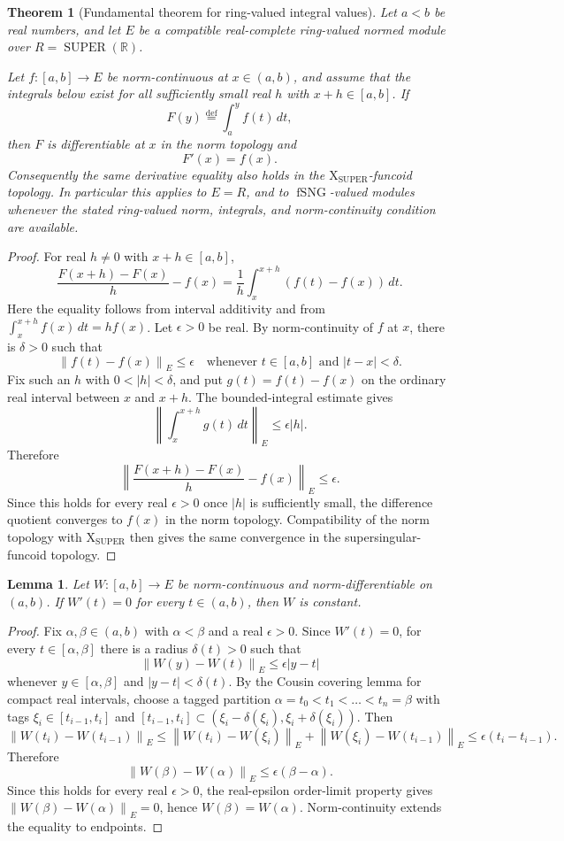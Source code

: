 \documentclass{amsart}
\newtheorem{thm}{Theorem}
\newtheorem{lem}{Lemma}
\DeclareMathOperator{\SUPER}{SUPER}
\DeclareMathOperator{\fSNG}{fSNG}
\newcommand{\eqdef}{\overset{\mathrm{def}}{=}}
\newcommand{\norm}[1]{\left\lVert #1\right\rVert}
\newcommand{\abs}[1]{\left\lvert #1\right\rvert}
\begin{document}
\begin{thm}[Fundamental theorem for ring-valued integral values]
Let $a<b$ be real numbers, and let $E$ be a compatible real-complete
ring-valued normed module over $R=\SUPER(\mathbb{R})$.

Let $f:[a,b]\to E$ be norm-continuous at $x\in(a,b)$, and assume that the
integrals below exist for all sufficiently small real $h$ with
$x+h\in[a,b]$.
If
\[
  F(y)\eqdef\int_a^y f(t)\,dt ,
\]
then $F$ is differentiable at $x$ in the norm topology and
\[
  F'(x)=f(x).
\]
Consequently the same derivative equality also holds in the
$\mathrm{X}_{\SUPER}$-funcoid topology.  In particular this applies to
$E=R$, and to $\fSNG$-valued modules whenever the stated ring-valued norm,
integrals, and norm-continuity condition are available.
\end{thm}

\begin{proof}
For real $h\neq0$ with $x+h\in[a,b]$,
\[
  \frac{F(x+h)-F(x)}{h}-f(x)
  =
  \frac{1}{h}\int_x^{x+h}(f(t)-f(x))\,dt .
\]
Here the equality follows from interval additivity and from
$\int_x^{x+h} f(x)\,dt=hf(x)$.
Let $\epsilon>0$ be real.  By norm-continuity of $f$ at $x$, there is
$\delta>0$ such that
\[
  \norm{f(t)-f(x)}_E\leq\epsilon
  \quad\text{whenever } t\in[a,b]\text{ and } \abs{t-x}<\delta .
\]
Fix such an $h$ with $0<\abs{h}<\delta$, and put $g(t)=f(t)-f(x)$ on the
ordinary real interval between $x$ and $x+h$.  The bounded-integral estimate
gives
\[
  \norm{\int_x^{x+h}g(t)\,dt}_E\leq\epsilon\abs{h}.
\]
Therefore
\[
  \norm{\frac{F(x+h)-F(x)}{h}-f(x)}_E
  \leq\epsilon .
\]
Since this holds for every real $\epsilon>0$ once $\abs{h}$ is sufficiently
small, the difference quotient converges to $f(x)$ in the norm topology.
Compatibility of the norm topology with $\mathrm{X}_{\SUPER}$ then gives the
same convergence in the supersingular-funcoid topology.
\end{proof}

\begin{lem}
Let $W:[a,b]\to E$ be norm-continuous and norm-differentiable on $(a,b)$.  If
$W'(t)=0$ for every $t\in(a,b)$, then $W$ is constant.
\end{lem}

\begin{proof}
Fix $\alpha,\beta\in(a,b)$ with $\alpha<\beta$ and a real $\epsilon>0$.  Since
$W'(t)=0$, for every $t\in[\alpha,\beta]$ there is a radius $\delta(t)>0$ such
that
\[
  \norm{W(y)-W(t)}_E\leq\epsilon\abs{y-t}
\]
whenever $y\in[\alpha,\beta]$ and $\abs{y-t}<\delta(t)$.  By the Cousin
covering lemma for compact real intervals, choose a tagged partition
$\alpha=t_0<t_1<\dots<t_n=\beta$ with tags $\xi_i\in[t_{i-1},t_i]$ and
$[t_{i-1},t_i]\subset(\xi_i-\delta(\xi_i),\xi_i+\delta(\xi_i))$.  Then
\[
  \norm{W(t_i)-W(t_{i-1})}_E
  \leq
  \norm{W(t_i)-W(\xi_i)}_E+\norm{W(\xi_i)-W(t_{i-1})}_E
  \leq\epsilon(t_i-t_{i-1}).
\]
Therefore
\[
  \norm{W(\beta)-W(\alpha)}_E
  \leq\epsilon(\beta-\alpha).
\]
Since this holds for every real $\epsilon>0$, the real-epsilon order-limit
property gives $\norm{W(\beta)-W(\alpha)}_E=0$, hence
$W(\beta)=W(\alpha)$.  Norm-continuity extends the equality to endpoints.
\end{proof}
\end{document}
